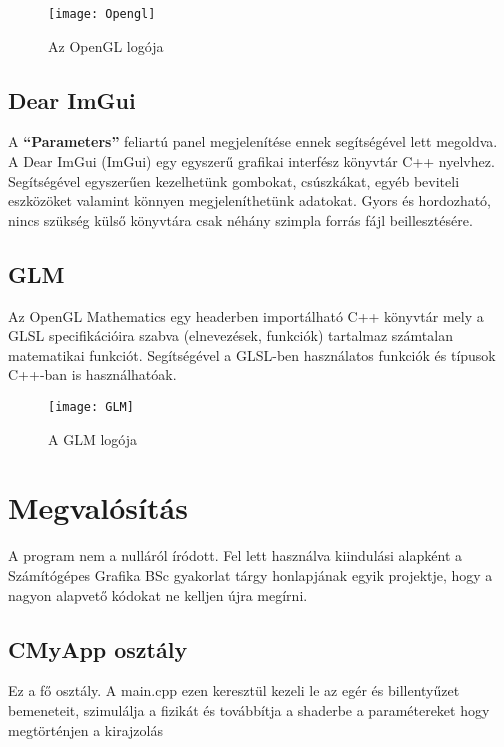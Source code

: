 \begin{figure}[H]
	\centering
	\texttt{[image: Opengl]}
	\caption{Az OpenGL logója}
	\label{fig:Opengl}
\end{figure}

\subsection{Dear ImGui}
A \textbf{``Parameters''} feliartú panel megjelenítése ennek segítségével lett megoldva. A Dear ImGui (ImGui) egy egyszerű grafikai interfész könyvtár C++ nyelvhez. Segítségével egyszerűen kezelhetünk gombokat, csúszkákat, egyéb beviteli eszközöket valamint könnyen megjeleníthetünk adatokat. Gyors és hordozható, nincs szükség külső könyvtára csak néhány szimpla forrás fájl beillesztésére. \cite{ocornuti13:online}

\subsection{GLM}

Az OpenGL Mathematics egy headerben importálható C++ könyvtár mely a GLSL specifikációira szabva (elnevezések, funkciók) tartalmaz számtalan matematikai funkciót. Segítségével a GLSL-ben használatos funkciók és típusok C++-ban is használhatóak. \cite{OpenGLMa34:online}

\begin{figure}[H]
	\centering
	\texttt{[image: GLM]}
	\caption{A GLM logója}
	\label{fig:GLM}
\end{figure}

\section{Megvalósítás}

A program nem a nulláról íródott. Fel lett használva kiindulási alapként a Számítógépes Grafika BSc gyakorlat tárgy honlapjának \cite{GrafikaB26:online} egyik projektje, hogy a nagyon alapvető kódokat ne kelljen újra megírni. 

\subsection{CMyApp osztály}

Ez a fő osztály. A main.cpp ezen keresztül kezeli le az egér és billentyűzet bemeneteit, szimulálja a fizikát és továbbítja a shaderbe a paramétereket hogy megtörténjen a kirajzolás


